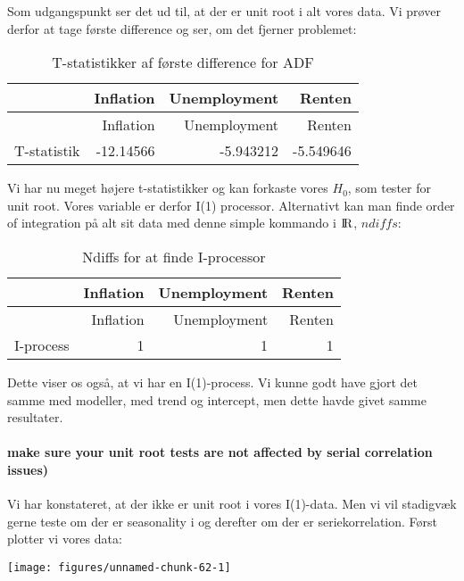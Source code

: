 \documentclass[
  10pt,
]{article}
\begin{document}
Som udgangspunkt ser det ud til, at der er unit root i alt vores data.
Vi prøver derfor at tage første difference og ser, om det fjerner
problemet:

\begin{longtable}[]{@{}lrrr@{}}
\caption{T-statistikker af første difference for ADF}\tabularnewline
\toprule
& Inflation & Unemployment & Renten\tabularnewline
\midrule
\endfirsthead
\toprule
& Inflation & Unemployment & Renten\tabularnewline
\midrule
\endhead
T-statistik & -12.14566 & -5.943212 & -5.549646\tabularnewline
\bottomrule
\end{longtable}

Vi har nu meget højere t-statistikker og kan forkaste vores \(H_0\), som
tester for unit root. Vores variable er derfor I(1) processor.
Alternativt kan man finde order of integration på alt sit data med denne
simple kommando i \({\rm I\!R}\), \(ndiffs\):

\begin{longtable}[]{@{}lrrr@{}}
\caption{Ndiffs for at finde I-processor}\tabularnewline
\toprule
& Inflation & Unemployment & Renten\tabularnewline
\midrule
\endfirsthead
\toprule
& Inflation & Unemployment & Renten\tabularnewline
\midrule
\endhead
I-process & 1 & 1 & 1\tabularnewline
\bottomrule
\end{longtable}

Dette viser os også, at vi har en I(1)-process. Vi kunne godt have gjort
det samme med modeller, med trend og intercept, men dette havde givet
samme resultater.

\newpage

\hypertarget{make-sure-your-unit-root-tests-are-not-affected-by-serial-correlation-issues}{%
\paragraph{make sure your unit root tests are not affected by serial
correlation
issues)}\label{make-sure-your-unit-root-tests-are-not-affected-by-serial-correlation-issues}}

\leavevmode

Vi har konstateret, at der ikke er unit root i vores I(1)-data. Men vi
vil stadigvæk gerne teste om der er seasonality i og derefter om der er
seriekorrelation. Først plotter vi vores data:

\begin{center}\texttt{[image: figures/unnamed-chunk-62-1]} \end{center}
\end{document}
